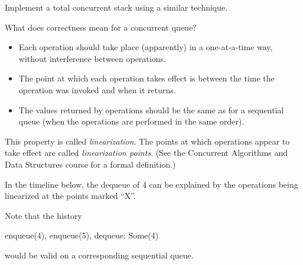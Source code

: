 
\begin{slide}

Implement a total concurrent stack using a similar technique.
\end{slide}


\begin{slide}

What does correctness mean for a concurrent queue?
\begin{itemize}
\item Each operation should take place (apparently) in a one-at-a-time way,
without interference between operations.  

\item The point at which each operation takes effect is between the time the
operation was invoked and when it returns.  

\item The values returned by operations should be the same as for a sequential
queue (when the operations are performed in the same order). 
\end{itemize}

This property is called \emph{linearization}.  The points at which operations
appear to take effect are called \emph{linearization points}.  (See the
Concurrent Algorithms and Data Structures course for a formal definition.)
\end{slide}





\begin{slide}

In the timeline below, the dequeue of 4 can be explained by the operations
being linearized at the points marked ``X''.
%
\unScalaMid
{}


Note that the history
\begin{scala}
  enqueue(4), enqueue(5), dequeue: Some(4)
\end{scala}
would be valid on a corresponding sequential queue. 
\end{slide}

